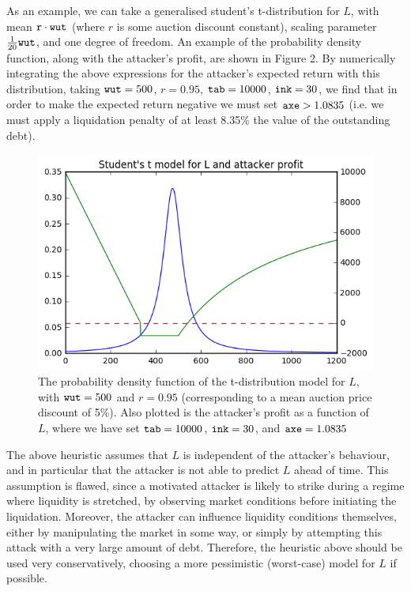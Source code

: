 \documentclass[a4paper,10pt]{article}
\begin{document}
\par As an example, we can take a generalised student's t-distribution for $L$, with mean ${\tt r \cdot wut}$ (where $r$ is some auction discount constant), scaling parameter $\frac{1}{20}{\tt wut}$, and one degree of freedom. An example of the probability density function, along with the attacker's profit, are shown in Figure 2. By numerically integrating the above expressions for the attacker's expected return with this distribution, taking ${\tt wut} = 500$, $r = 0.95$, ${\tt tab} = 10000$, ${\tt ink} = 30$, we find that in order to make the expected return negative we must set ${\tt axe} > 1.0835$ (i.e. we must apply a liquidation penalty of at least 8.35\% the value of the outstanding debt).

\begin{figure}[h]
    \centering
    \includegraphics[width=4.5in]{tgraph}
    \caption{The probability density function of the t-distribution model for $L$, with ${\tt wut} = 500$ and $r = 0.95$ (corresponding to a mean auction price discount of 5\%). Also plotted is the attacker's profit as a function of $L$, where we have set ${\tt tab} = 10000$, ${\tt ink} = 30$, and ${\tt axe} = 1.0835$}
\end{figure}

The above heuristic assumes that $L$ is independent of the attacker's behaviour, and in particular that the attacker is not able to predict $L$ ahead of time. This assumption is flawed, since a motivated attacker is likely to strike during a regime where liquidity is stretched, by observing market conditions before initiating the liquidation. Moreover, the attacker can influence liquidity conditions themselves, either by manipulating the market in some way, or simply by attempting this attack with a very large amount of debt. Therefore, the heuristic above should be used very conservatively, choosing a more pessimistic (worst-case) model for $L$ if possible.
\end{document}
